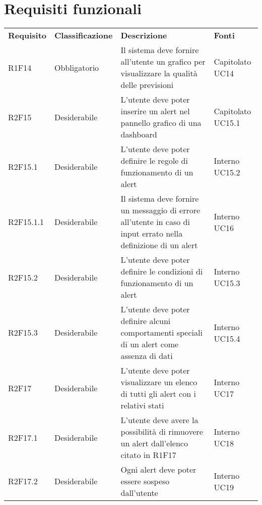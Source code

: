 \section{Requisiti funzionali}
	\begin{longtable} {
		>{}p{24mm} 
		>{}p{32mm}
		>{}p{40mm} 
		>{}p{24.5mm}
		}
	\rowcolor{gray!50}
		\textbf{Requisito} & 
		\textbf{Classificazione} & 
		\textbf{Descrizione} & 
		\textbf{Fonti} 	\TBstrut \\
		
		R1F14 & 
		Obbligatorio & 
		Il sistema deve fornire all'utente un grafico per visualizzare la qualità delle previsioni & 
		Capitolato UC14 \TBstrut \\ [2mm]
		
		R2F15 &
		Desiderabile &
		L'utente deve poter inserire un alert nel pannello grafico di una dashboard\glo &
		Capitolato UC15.1 \TBstrut \\ [2mm]
		
		R2F15.1 &
		Desiderabile &
		L'utente deve poter definire le regole di funzionamento di un alert &
		Interno UC15.2 \TBstrut \\ [2mm]
		
		R2F15.1.1 &
		Desiderabile &
		Il sistema deve fornire un messaggio di errore all'utente in caso di input errato nella definizione di un alert &
		Interno UC16 \TBstrut \\ [2mm]
		
		R2F15.2 & 
		Desiderabile & 
		L'utente deve poter definire le condizioni di funzionamento di un alert &
		Interno UC15.3 \TBstrut \\ [2mm]
		
		R2F15.3 &
		Desiderabile &
		L'utente deve poter definire alcuni comportamenti speciali di un alert come assenza di dati &
		Interno UC15.4 \TBstrut \\ [2mm]
		
		R2F17 &		
		Desiderabile & 
		L'utente deve poter visualizzare un elenco di tutti gli alert con i relativi stati & 
		Interno UC17 \TBstrut \\ [2mm]
		
		R2F17.1 & 
		Desiderabile & 
		L'utente deve avere la possibilità di rimuovere un alert dall'elenco citato in R1F17 & 
		Interno UC18 \TBstrut \\ [2mm]
		
		R2F17.2 &
		Desiderabile & 
		Ogni alert deve poter essere sospeso dall'utente & 
		Interno UC19 \TBstrut \\ [2mm]
		
	\end{longtable}